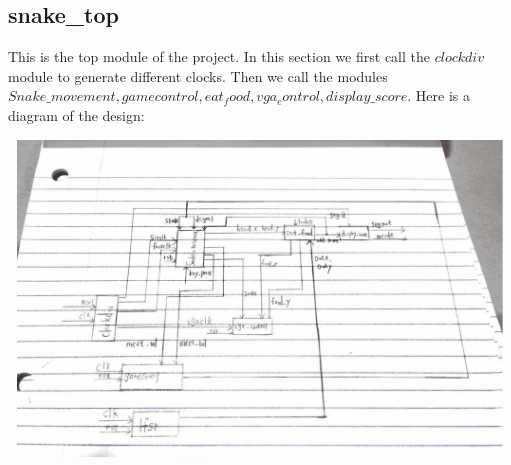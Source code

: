 \documentclass[12pt]{article}
\begin{document}
\subsection*{snake\_top}
This is the top module of the project. In this section we first call the $clockdiv$ module to generate different clocks. Then we call the modules $Snake\_movement, gamecontrol, eat_food, vga_control, display\_score$. Here is a diagram of the design:\\ 
\begin{minipage}{\linewidth}
            \centering
            \includegraphics[width=13.8cm, height=8.4cm]{diagram.png}
            \label{fig:figure1}
        \end{minipage} 
        
\end{document}

